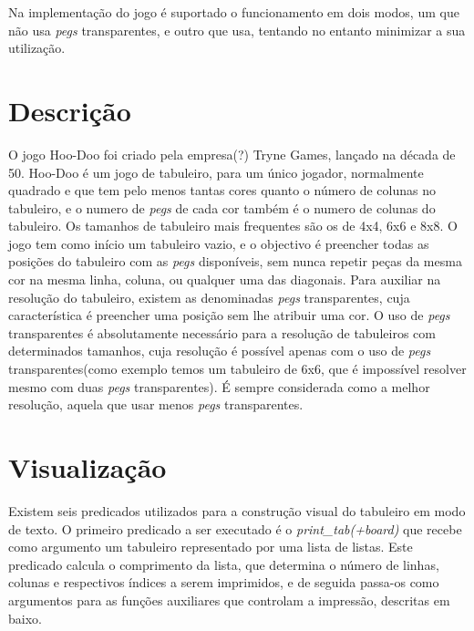 \documentclass{llncs}
\begin{document}
Na implementa\c{c}\~{a}o do jogo \'{e} suportado o funcionamento em dois modos, um que n\~{a}o usa \emph{pegs} transparentes, e outro que usa, tentando no entanto minimizar a sua utiliza\c{c}\~{a}o.

%

\section{Descri\c{c}\~{a}o}
%
O jogo Hoo-Doo foi criado pela empresa(?) Tryne Games, lan\c{c}ado na d\'{e}cada de 50. Hoo-Doo \'{e} um jogo de tabuleiro, para um \'{u}nico jogador, normalmente quadrado e que tem pelo menos tantas cores quanto o n\'{u}mero de colunas no tabuleiro, e o numero de \emph{\emph{pegs}} de cada cor tamb\'{e}m \'{e} o numero de colunas do tabuleiro. Os tamanhos de tabuleiro mais frequentes s\~{a}o os de 4x4, 6x6 e 8x8. O jogo tem como in\'{i}cio um tabuleiro vazio, e o objectivo \'{e} preencher todas as posi\c{c}\~{o}es do tabuleiro com as \emph{pegs} dispon\'{i}veis, sem nunca repetir pe\c{c}as da mesma cor na mesma linha, coluna, ou qualquer uma das diagonais. Para auxiliar na resolu\c{c}\~{a}o do tabuleiro, existem as denominadas \emph{pegs} transparentes, cuja caracter\'{i}stica \'{e} preencher uma posi\c{c}\~{a}o sem lhe atribuir uma cor. O uso de \emph{pegs} transparentes \'{e} absolutamente necess\'{a}rio para a resolu\c{c}\~{a}o de tabuleiros com determinados tamanhos, cuja resolu\c{c}\~{a}o \'{e} poss\'{i}vel apenas com o uso de \emph{pegs} transparentes(como exemplo temos um tabuleiro de 6x6, que \'{e} imposs\'{i}vel resolver mesmo com duas \emph{pegs} transparentes). \'{E} sempre considerada como a melhor resolu\c{c}\~{a}o, aquela que usar menos \emph{pegs} transparentes.




\section{Visualiza\c{c}\~{a}o}
%
Existem seis predicados utilizados para a constru\c{c}\~{a}o visual do tabuleiro em modo de texto. O primeiro predicado a ser executado \'{e} o \textit{print\_tab(+board)} que recebe como argumento um tabuleiro representado por uma lista de listas. Este predicado calcula o comprimento da lista, que determina o n\'{u}mero de linhas, colunas e respectivos \'{i}ndices a serem imprimidos, e de seguida passa-os como argumentos  para as fun\c{c}\~{o}es auxiliares que controlam a impress\~{a}o, descritas em baixo.
\end{document}
